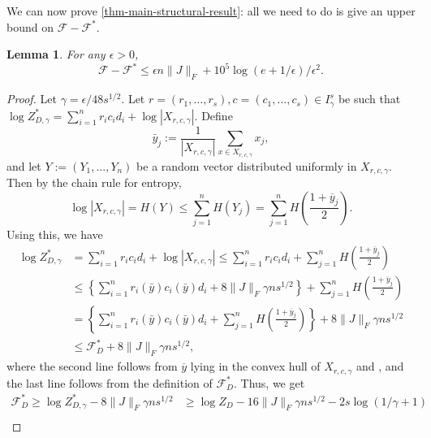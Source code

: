 \documentclass[final, 12pt]{colt2018}
\newcommand{\F}{\mathcal{F}}
\newtheorem{lemma}[theorem]{Lemma}
\theoremstyle{definition}
\theoremstyle{plain}
\begin{document}
We can now prove \cref{thm-main-structural-result}:
 all we need to do is give an upper bound on $\F - \F^{*}$.
\iffalse. Note that we only need to prove the upper bound on $|\F - \F^{*}|$ -- the statement about the KL-divergence follows immediately from this upper bound and \cref{rmk:variational-free-energy}. Furthermore, from \cref{rmk:free-energy-variational-char} and \cref{rmk:variational-free-energy} we see automatically that $\F^* \ge \F$ so we need only prove an upper bound on $\F^* - \F$.
\fi
\begin{lemma}\label{lemma:epsilon-bound}
For any $\epsilon > 0$,
\[ \F - \mathcal{F^*} \le \epsilon n \|J\|_F + 10^5 \log(e + 1/\epsilon)/\epsilon^2. \]
\end{lemma}
\begin{proof}%
\label{proof:main-structural-result}
Let $\gamma=\epsilon/48s^{1/2}$. 
Let $r=(r_1,\dots,r_s),c=(c_1,\dots,c_s) \in I_{\gamma}^{s}$ be such that $\log Z^{*}_{D,\gamma}=\sum_{i=1}^{n}r_{i}c_{i}d_{i}+\log|X_{r,c,\gamma}|$. 
Define
\[ \bar{y}_j := \frac{1}{|X_{r,c,\gamma}|} \sum_{x \in X_{r,c,\gamma}} x_j, \]
and let $Y := (Y_1, \ldots, Y_n)$ be a random vector distributed uniformly in 
$X_{r,c,\gamma}$. Then by the chain rule for entropy,
\[ \log |X_{r,c,\gamma}| = H(Y) \le \sum_{j = 1}^n H(Y_j) = \sum_{j = 1}^n H\left(\frac{1 + \overline{y}_j}{2}\right). \]
Using this, we have 
\begin{align*}
\log Z_{D,\gamma}^{*} & =\sum_{i=1}^{n}r_{i}c_{i}d_{i}+\log|X_{r,c,\gamma}|%
 \leq\sum_{i=1}^{n}r_{i}c_{i}d_{i}+\sum_{j = 1}^n H\left(\frac{1 + \overline{y}_j}{2}\right)\\
 & \leq\left\{ \sum_{i=1}^{n}r_{i}(\bar{y})c_{i}(\bar{y})d_{i}+8\|J\|_F\gamma ns^{1/2}\right\} + \sum_{j = 1}^n H\left(\frac{1 + \overline{y}_j}{2}\right)\\
 & =\left\{ \sum_{i=1}^{n}r_{i}(\bar{y})c_{i}(\bar{y})d_{i}+\sum_{j = 1}^n H\left(\frac{1 + \overline{y}_j}{2}\right)\right\} +8\|J\|_F\gamma ns^{1/2}\\
 & \leq \F_{D}^{*}+8\|J\|_F\gamma ns^{1/2},
\end{align*}
where the second line follows from $\overline{y}$ lying in the convex hull of $X_{r,c,\gamma}$ and , and the last line follows from the definition of $\F^{*}_{D}$. Thus, we get
\begin{align*}
\F_{D}^{*} \geq \log Z_{D,\gamma}^{*} - 8\|J\|_F\gamma ns^{1/2}
 & \geq \log Z_{D} - 16\|J\|_F\gamma ns^{1/2} - 2s\log(1/\gamma + 1)\\

\end{align*}
\end{proof}
\end{document}
